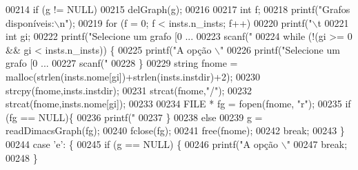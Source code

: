 \begin{DoxyCode}
{{{{{{{{{{{{{{{00214                         \textcolor{keywordflow}{if} (g != NULL)
00215                                 delGraph(g);
00216 
00217                         \textcolor{keywordtype}{int} f;
00218                         printf(\textcolor{stringliteral}{"Grafos disponíveis:\(\backslash\)n"});
00219                         \textcolor{keywordflow}{for} (f = 0; f < insts.n\_insts; f++)
00220                                 printf(\textcolor{stringliteral}{"\(\backslash\)t%
00221                         \textcolor{keywordtype}{int} gi;
00222                         printf(\textcolor{stringliteral}{"Selecione um grafo [0 ... %
00223                         scanf(\textcolor{stringliteral}{"%
00224                         \textcolor{keywordflow}{while} (!(gi >= 0 && gi < insts.n\_insts)) \{
00225                                 printf(\textcolor{stringliteral}{"A opção \(\backslash\)"%
00226                                 printf(\textcolor{stringliteral}{"Selecione um grafo [0 ... %
00227                                 scanf(\textcolor{stringliteral}{"%
00228                         \}
00229                         \textcolor{keywordtype}{string} fnome = malloc(strlen(insts.nome[gi])+strlen(insts.instdir)+2);
00230                         strcpy(fnome,insts.instdir);
00231                         strcat(fnome,\textcolor{stringliteral}{"/"});
00232                         strcat(fnome,insts.nome[gi]);
00233 
00234                         FILE * fg = fopen(fnome, \textcolor{stringliteral}{"r"});
00235                         \textcolor{keywordflow}{if} (fg == NULL)\{
00236                                 printf(\textcolor{stringliteral}{"%
00237                         \}
00238                         \textcolor{keywordflow}{else}
00239                                 g = readDimacsGraph(fg);
00240                         fclose(fg);
00241                         free(fnome);
00242                         \textcolor{keywordflow}{break};
00243                 \}
00244                 \textcolor{keywordflow}{case} \textcolor{charliteral}{'e'}: \{
00245                         \textcolor{keywordflow}{if} (g == NULL) \{
00246                                 printf(\textcolor{stringliteral}{"A opção \(\backslash\)"%
00247                                 \textcolor{keywordflow}{break};
00248                         \}
}}}}}}}}}}}}}}}}}}}}}}}
\end{DoxyCode}
